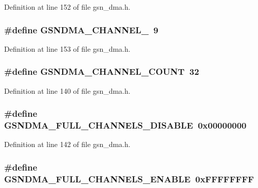 Definition at line 152 of file gsn\_\-dma.h.

\hypertarget{a00484_a9b9e452e110eedb35f128e734e16ef64}{
\subsubsection[{GSNDMA\_\-CHANNEL\_\-9}]{\setlength{\rightskip}{0pt plus 5cm}\#define GSNDMA\_\-CHANNEL\_~9}}
\label{a00484_a9b9e452e110eedb35f128e734e16ef64}


Definition at line 153 of file gsn\_\-dma.h.

\hypertarget{a00484_a05c6a73586179b2bc758895613204d0c}{
\subsubsection[{GSNDMA\_\-CHANNEL\_\-COUNT}]{\setlength{\rightskip}{0pt plus 5cm}\#define GSNDMA\_\-CHANNEL\_\-COUNT~32}}
\label{a00484_a05c6a73586179b2bc758895613204d0c}


Definition at line 140 of file gsn\_\-dma.h.

\hypertarget{a00484_a7294ea06db1a491f659cf220e1b51c0b}{
\subsubsection[{GSNDMA\_\-FULL\_\-CHANNELS\_\-DISABLE}]{\setlength{\rightskip}{0pt plus 5cm}\#define GSNDMA\_\-FULL\_\-CHANNELS\_\-DISABLE~0x00000000}}
\label{a00484_a7294ea06db1a491f659cf220e1b51c0b}


Definition at line 142 of file gsn\_\-dma.h.

\hypertarget{a00484_acb90501fb017d4fdd51aab3c5591a555}{
\subsubsection[{GSNDMA\_\-FULL\_\-CHANNELS\_\-ENABLE}]{\setlength{\rightskip}{0pt plus 5cm}\#define GSNDMA\_\-FULL\_\-CHANNELS\_\-ENABLE~0xFFFFFFFF}}
\label{a00484_acb90501fb017d4fdd51aab3c5591a555}


